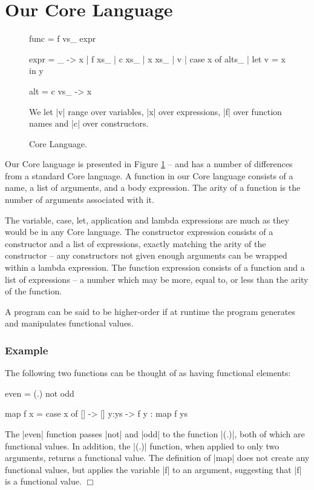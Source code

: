 \documentclass[preprint]{sigplanconf}
\newcounter{exmp}
\newenvironment{exampleany}[1]
    {\subsubsection*{Example #1}}
    {\hfill$\Box$}
\newenvironment{example}
    {\refstepcounter{exmp}
     \begin{exampleany}{\arabic{exmp}}}
    {\end{exampleany}}
\begin{document}
\section{Our Core Language}

\begin{figure}
\begin{code}
func = f vs_ expr

expr  =  \vs_ -> x
      |  f xs_
      |  c xs_
      |  x xs_
      |  v
      |  case x of alts_
      |  let v = x in y

alt = c vs_ -> x
\end{code}

We let |v| range over variables, |x| over expressions, |f| over function names and |c| over constructors.
\caption{Core Language.}
\label{fig:core}
\end{figure}

Our Core language is presented in Figure \ref{fig:core} -- and has a number of differences from a standard Core language. A function in our Core language consists of a name, a list of arguments, and a body expression. The arity of a function is the number of arguments associated with it.

The variable, case, let, application and lambda expressions are much as they would be in any Core language. The constructor expression consists of a constructor and a list of expressions, exactly matching the arity of the constructor -- any constructors not given enough arguments can be wrapped within a lambda expression. The function expression consists of a function and a list of expressions -- a number which may be more, equal to, or less than the arity of the function.

A program can be said to be higher-order if at runtime the program generates and manipulates functional values.

\begin{example}
\label{ex:ho_elements}
The following two functions can be thought of as having functional elements:

\begin{code}
even = (.) not odd

map f x = case  x of
                []    -> []
                y:ys  -> f y : map f ys
\end{code}

The |even| function passes |not| and |odd| to the function |(.)|, both of which are functional values. In addition, the |(.)| function, when applied to only two arguments, returns a functional value. The definition of |map| does not create any functional values, but applies the variable |f| to an argument, suggesting that |f| is a functional value.
\end{example}
\end{document}
